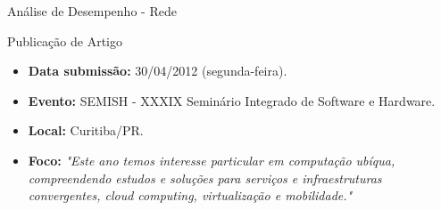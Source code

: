 \documentclass{beamer}
\begin{document}
\begin{frame}{Análise de Desempenho - Rede}
\begin{figure}[ht] 
	\centering
	\quad
	\quad
	\quad
	\quad
\end{figure}
\end{frame}


\begin{frame}{Publicação de Artigo}
\begin{itemize}
\item \textbf{Data submissão:} 30/04/2012 (segunda-feira).
\item \textbf{Evento:} SEMISH - XXXIX Seminário Integrado de Software e Hardware.
\item \textbf{Local:} Curitiba/PR.
\item \textbf{Foco:} \textit{"Este ano temos interesse particular em computação ubíqua, compreendendo estudos e soluções para serviços e infraestruturas convergentes, cloud computing, virtualização e mobilidade."}
\end{itemize}
\end{frame}
\end{document}

